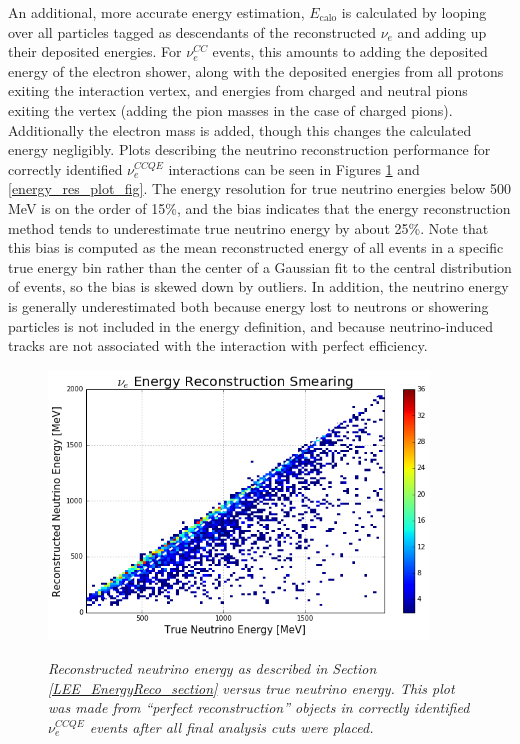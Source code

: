 An additional, more accurate energy estimation, $E_{\text{calo}}$ is calculated by looping over all particles tagged as descendants of the reconstructed $\nu_e$ and adding up their deposited energies. For $\nu_e^{CC}$ events, this amounts to adding the deposited energy of the electron shower, along with the deposited energies from all protons exiting the interaction vertex, and energies from charged and neutral pions exiting the vertex (adding the pion masses in the case of charged pions). Additionally the electron mass is added, though this changes the calculated energy negligibly. Plots describing the neutrino reconstruction performance for correctly identified $\nu_e^{CCQE}$ interactions can be seen in Figures \ref{energy_smear_plot_fig} and \ref{energy_res_plot_fig}. The energy resolution for true neutrino energies below 500 MeV is on the order of 15\%, and the bias indicates that the energy reconstruction method tends to underestimate true neutrino energy by about 25\%. Note that this bias is computed as the mean reconstructed energy of all events in a specific true energy bin rather than the center of a Gaussian fit to the central distribution of events, so the bias is skewed down by outliers. In addition, the neutrino energy is generally underestimated both because energy lost to neutrons or showering particles is not included in the energy definition, and because neutrino-induced tracks are not associated with the interaction with perfect efficiency.

\begin{figure}[ht!]
\centering
\includegraphics[width=0.9\textwidth]{Figures/LEE_EnergySmear_WithAnalysisCuts.png}\\%
\caption{\textit{Reconstructed neutrino energy as described in Section \ref{LEE_EnergyReco_section} versus true neutrino energy. This plot was made from ``perfect reconstruction'' objects in correctly identified $\nu_e^{CCQE}$ events after all final analysis cuts were placed.}}
\label{energy_smear_plot_fig}
\end{figure}

